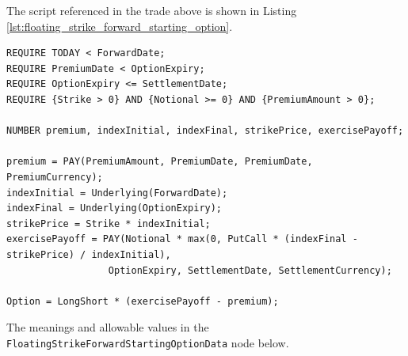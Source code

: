 The script referenced in the trade above is shown in Listing \ref{lst:floating_strike_forward_starting_option}.

\begin{listing}[hbt]
\begin{verbatim}
REQUIRE TODAY < ForwardDate;
REQUIRE PremiumDate < OptionExpiry;
REQUIRE OptionExpiry <= SettlementDate;
REQUIRE {Strike > 0} AND {Notional >= 0} AND {PremiumAmount > 0};

NUMBER premium, indexInitial, indexFinal, strikePrice, exercisePayoff;

premium = PAY(PremiumAmount, PremiumDate, PremiumDate, PremiumCurrency);
indexInitial = Underlying(ForwardDate);
indexFinal = Underlying(OptionExpiry);
strikePrice = Strike * indexInitial;
exercisePayoff = PAY(Notional * max(0, PutCall * (indexFinal - strikePrice) / indexInitial),
                  OptionExpiry, SettlementDate, SettlementCurrency);

Option = LongShort * (exercisePayoff - premium);
\end{verbatim}
\caption{Payoff script for a Floating Strike Forward Starting Option.}
\label{lst:floating_strike_forward_starting_option}
\end{listing}

The meanings and allowable values in the \lstinline!FloatingStrikeForwardStartingOptionData! node below.

